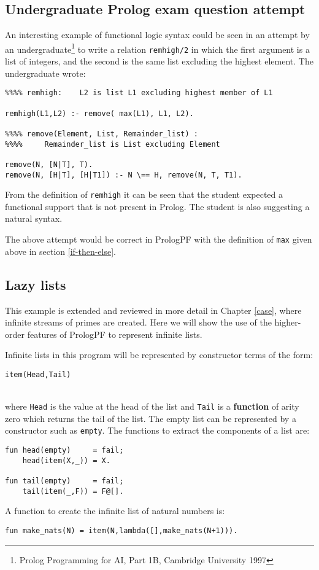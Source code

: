 \subsection{Undergraduate Prolog exam question attempt}

An interesting example of functional logic syntax could be seen in an
attempt by an undergraduate\footnote{Prolog Programming for AI, Part 1B,
Cambridge University 1997} to write a relation \texttt{remhigh/2} in which
the first argument is a list of integers, and the second is the same list
excluding the highest element.  The undergraduate wrote:
\begin{verbatim}
%%%% remhigh:    L2 is list L1 excluding highest member of L1

remhigh(L1,L2) :- remove( max(L1), L1, L2).

%%%% remove(Element, List, Remainder_list) :
%%%%     Remainder_list is List excluding Element

remove(N, [N|T], T).
remove(N, [H|T], [H|T1]) :- N \== H, remove(N, T, T1).
\end{verbatim}
From the definition of \texttt{remhigh} it can be seen that the student
expected a functional support that is not present in Prolog.  The student
is also suggesting a natural syntax.

The above attempt would be correct in PrologPF with the
definition of \texttt{max} given above in section \ref{if-then-else}.

\subsection{Lazy lists}

This example is extended and reviewed in more detail in
Chapter \ref{case}, where infinite streams of primes are
created.  Here we will show the use of the higher-order features of 
PrologPF to represent infinite lists.

Infinite lists in this program will be represented by constructor
terms of the form:\\
\centerline{\texttt{item(Head,Tail)}}\\
where \texttt{Head} is the value at the head of the list and \texttt{Tail}
is a \textbf{function} of arity zero which returns the tail of the list.  The empty
list can be represented by a constructor such as \texttt{empty}.
The functions to extract the components of a list are:
\begin{verbatim}
fun head(empty)     = fail;
    head(item(X,_)) = X.

fun tail(empty)     = fail;
    tail(item(_,F)) = F@[].
\end{verbatim}
A function to create the infinite list of natural numbers is:\\
\centerline{\texttt{fun make\_{}nats(N) = item(N,lambda([],make\_{}nats(N+1))).}}

